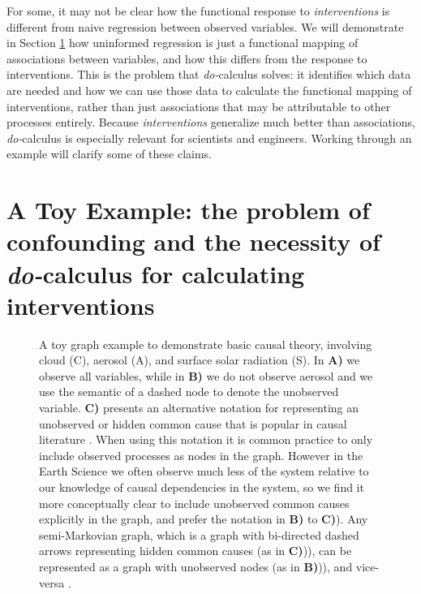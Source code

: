 \documentclass[12pt]{article}
\begin{document}
For some, it may not be clear how the functional response to
\emph{interventions} is different from naive regression between
observed variables. We will demonstrate in Section
\ref{sec:causal-graphs-pearls} how uninformed regression is just a
functional mapping of associations between variables, and how this
differs from the response to interventions. This is the problem that
\textit{do-}calculus solves: it identifies which data are needed and
how we can use those data to calculate the functional mapping of
interventions, rather than just associations that may be attributable
to other processes entirely. Because \emph{interventions} generalize
much better than associations, \textit{do-}calculus is especially
relevant for scientists and engineers. Working through an example will
clarify some of these claims.

\section{A Toy Example: the problem of confounding and the necessity
  of \textit{do-}calculus for calculating interventions}
\label{sec:causal-graphs-pearls}

\begin{figure}
  \scalebox{1.0}{}
  \caption{A toy graph example to demonstrate basic causal theory,
    involving cloud (C), aerosol (A), and surface solar radiation
    (S). In \textbf{A)} we observe all variables, while in \textbf{B)}
    we do not observe aerosol and we use the semantic of a dashed node
    to denote the unobserved variable. \textbf{C)} presents an
    alternative notation for representing an unobserved or hidden
    common cause that is popular in causal literature \citep[e.g.,
    ``semi-Markovian graphs'',][]{shpitser2006}. When using this
    notation it is common practice to only include observed processes
    as nodes in the graph. However in the Earth Science we often
    observe much less of the system relative to our knowledge of
    causal dependencies in the system, so we find it more conceptually
    clear to include unobserved common causes explicitly in the graph,
    and prefer the notation in \textbf{B)} to \textbf{C)}). Any
    semi-Markovian graph, which is a graph with bi-directed dashed
    arrows representing hidden common causes (as in \textbf{C)})), can
    be represented as a graph with unobserved nodes (as in
    \textbf{B)})), and vice-versa \citep[e.g.,][]{lee2019structural}.}
  \label{fig:toy}
\end{figure}
\end{document}
